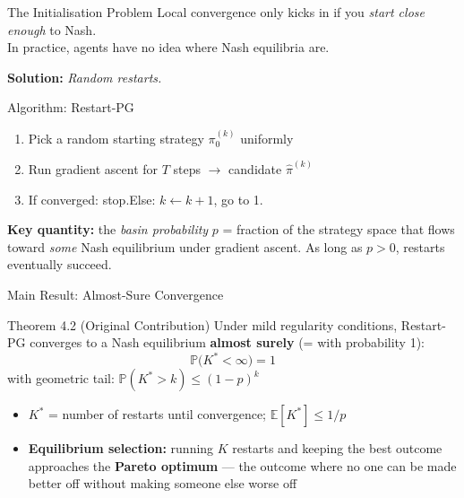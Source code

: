 \documentclass[aspectratio=169,11pt]{beamer}
\newcommand{\E}{\mathbb{E}}
\newcommand{\Prob}{\mathbb{P}}
\begin{document}
\begin{frame}{The Initialisation Problem}
  Local convergence only kicks in if you \emph{start close enough} to Nash.\\
  In practice, agents have no idea where Nash equilibria are.

  \bigskip

  \textbf{Solution:} \emph{Random restarts.}

  \begin{block}{Algorithm: Restart-PG}
    \begin{enumerate}
      \item Pick a random starting strategy $\pi_0^{(k)}$ uniformly
      \item Run gradient ascent for $T$ steps $\to$ candidate $\hat\pi^{(k)}$
      \item If converged: stop.\quad Else: $k \gets k+1$, go to 1.
    \end{enumerate}
  \end{block}

  \bigskip

  \textbf{Key quantity:} the \emph{basin probability} $p$ = fraction of the
  strategy space that flows toward \emph{some} Nash equilibrium under
  gradient ascent. \quad As long as $p > 0$, restarts eventually succeed.
\end{frame}

\begin{frame}{Main Result: Almost-Sure Convergence}
  \begin{block}{Theorem 4.2 (Original Contribution)}
    Under mild regularity conditions, Restart-PG converges to a Nash
    equilibrium \textbf{almost surely} (= with probability 1):
    \[
      \Prob\bigl(K^* < \infty\bigr) = 1
    \]
    with geometric tail:\quad
    $\Prob(K^* > k) \le (1 - p)^k$
  \end{block}

  \begin{itemize}
    \item $K^*$ = number of restarts until convergence;\quad
          $\E[K^*] \le 1/p$
    \item \textbf{Equilibrium selection:} running $K$ restarts and
      keeping the best outcome approaches the \textbf{Pareto optimum}
      --- the outcome where no one can be made better off
      without making someone else worse off
  \end{itemize}
\end{frame}
\end{document}
